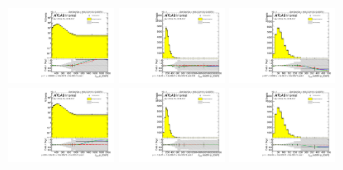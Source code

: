 \begin{figure}[htbp!]
\begin{center}
\includegraphics[width=0.25\textwidth,angle=-90]{figures/boosted/Reweight/Fits/Moriond_bkg_3_NoTag_4Trk_lead_Incl_sublHCand_Pt_m_1.pdf}
\includegraphics[width=0.25\textwidth,angle=-90]{figures/boosted/Reweight/Fits/Moriond_bkg_3_NoTag_4Trk_lead_Incl_sublHCand_trk0_Pt.pdf}
\includegraphics[width=0.25\textwidth,angle=-90]{figures/boosted/Reweight/Fits/Moriond_bkg_3_NoTag_4Trk_lead_Incl_sublHCand_trk1_Pt.pdf} \\
\includegraphics[width=0.25\textwidth,angle=-90]{figures/boosted/Reweight/Fits/Moriond_bkg_9_NoTag_4Trk_lead_Incl_sublHCand_Pt_m_1.pdf}
\includegraphics[width=0.25\textwidth,angle=-90]{figures/boosted/Reweight/Fits/Moriond_bkg_9_NoTag_4Trk_lead_Incl_sublHCand_trk0_Pt.pdf}
\includegraphics[width=0.25\textwidth,angle=-90]{figures/boosted/Reweight/Fits/Moriond_bkg_9_NoTag_4Trk_lead_Incl_sublHCand_trk1_Pt.pdf} \\

\end{center}
\end{figure}
